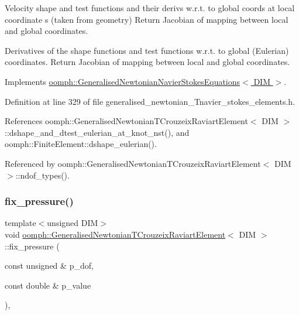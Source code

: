 Velocity shape and test functions and their derivs w.\+r.\+t. to global coords at local coordinate s (taken from geometry) Return Jacobian of mapping between local and global coordinates. 

Derivatives of the shape functions and test functions w.\+r.\+t. to global (Eulerian) coordinates. Return Jacobian of mapping between local and global coordinates. 

Implements \hyperlink{classoomph_1_1GeneralisedNewtonianNavierStokesEquations_a2607956e6619a4d3ef900bf65dd1ee8f}{oomph\+::\+Generalised\+Newtonian\+Navier\+Stokes\+Equations$<$ D\+I\+M $>$}.



Definition at line 329 of file generalised\+\_\+newtonian\+\_\+\+Tnavier\+\_\+stokes\+\_\+elements.\+h.



References oomph\+::\+Generalised\+Newtonian\+T\+Crouzeix\+Raviart\+Element$<$ D\+I\+M $>$\+::dshape\+\_\+and\+\_\+dtest\+\_\+eulerian\+\_\+at\+\_\+knot\+\_\+nst(), and oomph\+::\+Finite\+Element\+::dshape\+\_\+eulerian().



Referenced by oomph\+::\+Generalised\+Newtonian\+T\+Crouzeix\+Raviart\+Element$<$ D\+I\+M $>$\+::ndof\+\_\+types().

\mbox{\label{classoomph_1_1GeneralisedNewtonianTCrouzeixRaviartElement_a72e4201a4143b74992996e34df7eeb1f}} 
\subsubsection{\texorpdfstring{fix\+\_\+pressure()}{fix\_pressure()}}
{\footnotesize\ttfamily template$<$unsigned D\+IM$>$ \\
void \hyperlink{classoomph_1_1GeneralisedNewtonianTCrouzeixRaviartElement}{oomph\+::\+Generalised\+Newtonian\+T\+Crouzeix\+Raviart\+Element}$<$ D\+IM $>$\+::fix\+\_\+pressure (\begin{DoxyParamCaption}\item[{const unsigned \&}]{p\+\_\+dof,  }\item[{const double \&}]{p\+\_\+value }\end{DoxyParamCaption})\hspace{0.3cm}{\ttfamily [inline]}, {\ttfamily [virtual]}}



